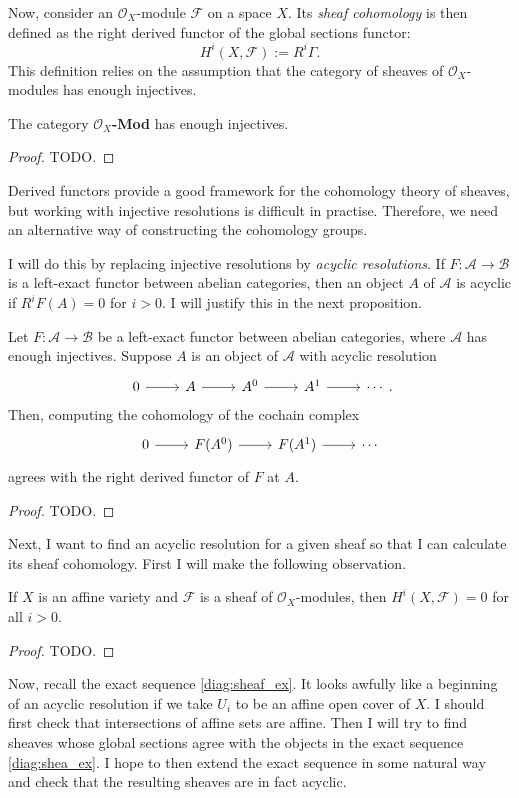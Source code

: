 Now, consider an $\mathcal{O}_{X}$-module $\mathcal{F}$ on a space $X$.
Its \emph{sheaf cohomology} is then defined as the right derived functor of
the global sections functor:
\[
  H^{i}(X, \mathcal{F}) := R^{i}\Gamma.
\]
This definition relies on the assumption that the category of sheaves of
$\mathcal{O}_{X}$-modules has enough injectives.
\begin{prop}
  The category $\mathcal{O}_{X}$\textup{\textbf{-Mod}} has enough injectives.
\end{prop}
\begin{proof}
  TODO.
\end{proof}
Derived functors provide a good framework for the cohomology theory of
sheaves, but working with injective resolutions is difficult in practise.
Therefore, we need an alternative way of constructing the cohomology groups.

I will do this by replacing injective resolutions by \emph{acyclic
  resolutions}. If $F:\mathcal{A}\to\mathcal{B}$ is a left-exact
functor between abelian categories, then an object $A$ of $\mathcal{A}$ is
acyclic if $R^{i}F(A)=0$ for $i>0$. I will justify this in the
next proposition.
\begin{prop}
  Let $F:\mathcal{A}\to\mathcal{B}$ be a left-exact functor
  between abelian categories, where $\mathcal{A}$ has enough injectives.
  Suppose $A$ is an object of $\mathcal{A}$ with acyclic resolution
  \[\begin{tikzcd}
      0\rar & A\rar & A^{0}\rar & A^{1}\rar & \cdots
    \end{tikzcd}.\]
  Then, computing the cohomology of the cochain complex
  \[\begin{tikzcd}
      0\rar & F(A^{0})\rar & F(A^{1})\rar & \cdots
    \end{tikzcd}\]
  agrees with the right derived functor of $F$ at $A$.
\end{prop}
\begin{proof}
  TODO.
\end{proof}
Next, I want to find an acyclic resolution for a given sheaf so that I can
calculate its sheaf cohomology. First I will make the following observation.
\begin{prop}\label{prop:affine_cohom_vanishes}
  If $X$ is an affine variety and $\mathcal{F}$ is a sheaf of
  $\mathcal{O}_{X}$-modules, then $H^{i}(X, \mathcal{F})=0$ for all $i>0$.
\end{prop}
\begin{proof}
  TODO.
\end{proof}
Now, recall the exact sequence \eqref{diag:sheaf_ex}. It looks awfully like
a beginning of an acyclic resolution if we take $U_{i}$ to be an affine
open cover of $X$. I should first check that intersections of affine
sets are affine. Then I will try to find sheaves whose global sections
agree with the objects in the exact sequence \eqref{diag:shea_ex}.
I hope to then extend the exact sequence in some natural way and check
that the resulting sheaves are in fact acyclic.

